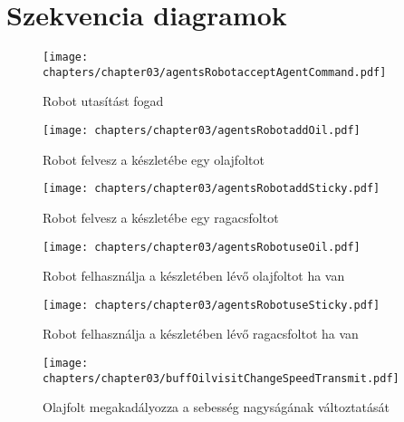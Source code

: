 \section{Szekvencia diagramok}

\begin{figure}[h]
	\begin{center}
		\texttt{[image: chapters/chapter03/agentsRobotacceptAgentCommand.pdf]}
		\caption{Robot utasítást fogad}
		\label{fig:agents.Robot.accept}
	\end{center}
\end{figure}

\begin{figure}[h]
	\begin{center}
		\texttt{[image: chapters/chapter03/agentsRobotaddOil.pdf]}
		\caption{Robot felvesz a készletébe egy olajfoltot}
		\label{fig:agents.Robot.addOil}
	\end{center}
\end{figure}

\begin{figure}[h]
	\begin{center}
		\texttt{[image: chapters/chapter03/agentsRobotaddSticky.pdf]}
		\caption{Robot felvesz a készletébe egy ragacsfoltot}
		\label{fig:agents.Robot.addSticky}
	\end{center}
\end{figure}

\begin{figure}[h]
	\begin{center}
		\texttt{[image: chapters/chapter03/agentsRobotuseOil.pdf]}
		\caption{Robot felhasználja a készletében lévő olajfoltot ha van}
		\label{fig:agents.Robot.useOil}
	\end{center}
\end{figure}

\begin{figure}[h]
	\begin{center}
		\texttt{[image: chapters/chapter03/agentsRobotuseSticky.pdf]}
		\caption{Robot felhasználja a készletében lévő ragacsfoltot ha van}
		\label{fig:agents.Robot.useSticky}
	\end{center}
\end{figure}

\begin{figure}[h]
	\begin{center}
		\texttt{[image: chapters/chapter03/buffOilvisitChangeSpeedTransmit.pdf]}
		\caption{Olajfolt megakadályozza a sebesség nagyságának változtatását}
		\label{fig:buff.Oil.visit}
	\end{center}
\end{figure}

